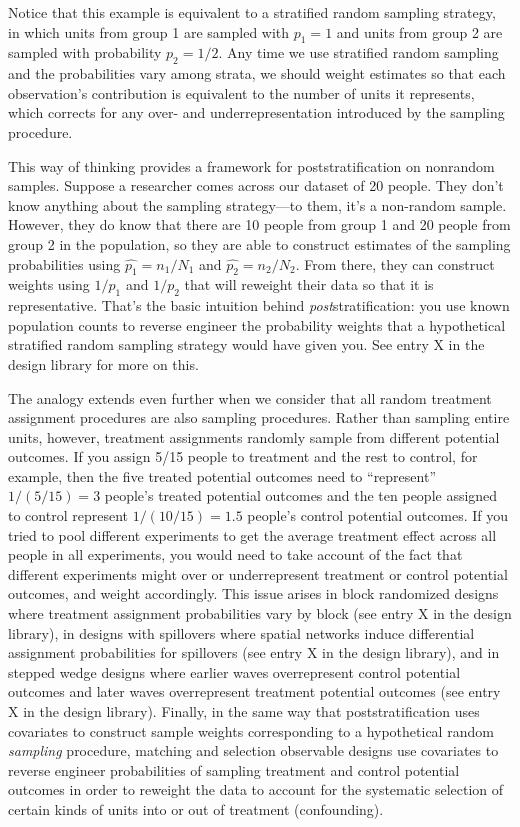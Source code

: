 \documentclass[
]{article}
\begin{document}
Notice that this example is equivalent to a stratified random sampling
strategy, in which units from group 1 are sampled with \(p_1 = 1\) and
units from group 2 are sampled with probability \(p_2 = 1/2\). Any time
we use stratified random sampling and the probabilities vary among
strata, we should weight estimates so that each observation's
contribution is equivalent to the number of units it represents, which
corrects for any over- and underrepresentation introduced by the
sampling procedure.

This way of thinking provides a framework for poststratification on
nonrandom samples. Suppose a researcher comes across our dataset of 20
people. They don't know anything about the sampling strategy---to them,
it's a non-random sample. However, they do know that there are 10 people
from group 1 and 20 people from group 2 in the population, so they are
able to construct estimates of the sampling probabilities using
\(\hat{p_1} = n_1/N_1\) and \(\hat{p_2} = n_2/N_2\). From there, they
can construct weights using \(1/p_1\) and \(1/p_2\) that will reweight
their data so that it is representative. That's the basic intuition
behind \textit{post}stratification: you use known population counts to
reverse engineer the probability weights that a hypothetical stratified
random sampling strategy would have given you. See entry X in the design
library for more on this.

The analogy extends even further when we consider that all random
treatment assignment procedures are also sampling procedures. Rather
than sampling entire units, however, treatment assignments randomly
sample from different potential outcomes. If you assign 5/15 people to
treatment and the rest to control, for example, then the five treated
potential outcomes need to ``represent'' \(1/(5/15) = 3\) people's
treated potential outcomes and the ten people assigned to control
represent \(1/(10/15) = 1.5\) people's control potential outcomes. If
you tried to pool different experiments to get the average treatment
effect across all people in all experiments, you would need to take
account of the fact that different experiments might over or
underrepresent treatment or control potential outcomes, and weight
accordingly. This issue arises in block randomized designs where
treatment assignment probabilities vary by block (see entry X in the
design library), in designs with spillovers where spatial networks
induce differential assignment probabilities for spillovers (see entry X
in the design library), and in stepped wedge designs where earlier waves
overrepresent control potential outcomes and later waves overrepresent
treatment potential outcomes (see entry X in the design library).
Finally, in the same way that poststratification uses covariates to
construct sample weights corresponding to a hypothetical random
\textit{sampling} procedure, matching and selection observable designs
use covariates to reverse engineer probabilities of sampling treatment
and control potential outcomes in order to reweight the data to account
for the systematic selection of certain kinds of units into or out of
treatment (confounding).
\end{document}
